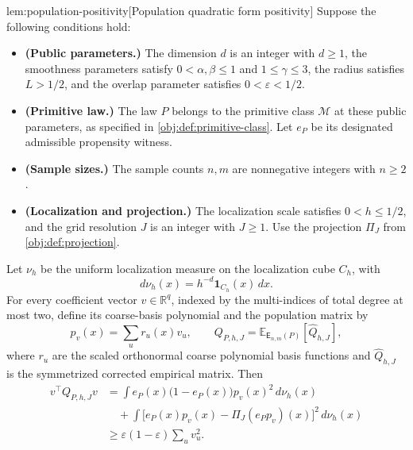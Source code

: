 \documentclass[11pt]{article}
\begin{document}
\begin{lemmav}{lem:population-positivity}[Population quadratic form positivity]
Suppose the following conditions hold:
\begin{itemize}
\item \textbf{(Public parameters.)} The dimension \(d\) is an integer with \(d\ge1\), the smoothness parameters satisfy \(0<\alpha,\beta\le1\) and \(1\le\gamma\le3\), the radius satisfies \(L>1/2\), and the overlap parameter satisfies \(0<\varepsilon<1/2\).
\item \textbf{(Primitive law.)} The law \(P\) belongs to the primitive class \(\mathcal M\) at these public parameters, as specified in \cref{obj:def:primitive-class}. Let \(e_P\) be its designated admissible propensity witness.
\item \textbf{(Sample sizes.)} The sample counts \(n,m\) are nonnegative integers with \(n\ge2\).
\item \textbf{(Localization and projection.)} The localization scale satisfies \(0<h\le1/2\), and the grid resolution \(J\) is an integer with \(J\ge1\). Use the projection \(\Pi_J\) from \cref{obj:def:projection}.
\end{itemize}
Let \(\nu_h\) be the uniform localization measure on the localization cube \(C_h\), with
\[
d\nu_h(x)=h^{-d}\mathbf 1_{C_h}(x)\,dx.
\]
For every coefficient vector \(v\in\mathbb R^q\), indexed by the multi-indices of total degree at most two, define its coarse-basis polynomial and the population matrix by
\[
p_v(x)=\sum_u r_u(x)v_u,
\qquad
Q_{P,h,J}
=\mathbb E_{\mathsf E_{n,m}(P)}[\widehat Q_{h,J}],
\]
where \(r_u\) are the scaled orthonormal coarse polynomial basis functions and \(\widehat Q_{h,J}\) is the symmetrized corrected empirical matrix. Then
\[
\begin{aligned}
v^\top Q_{P,h,J}v
&=\int e_P(x)\bigl(1-e_P(x)\bigr)p_v(x)^2\,d\nu_h(x)\\
&\quad+\int
\bigl[e_P(x)p_v(x)-\Pi_J(e_Pp_v)(x)\bigr]^2\,d\nu_h(x)\\
&\ge \varepsilon(1-\varepsilon)\sum_u v_u^2.
\end{aligned}
\]
\end{lemmav}
\end{document}
